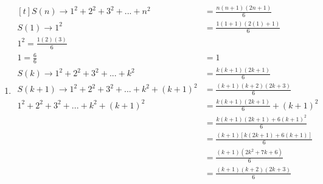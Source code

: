\begin{enumerate}[leftmargin=2cm,labelsep=.5cm,label=\bf\arabic*.]
\begin{enumerate}
\item $
\begin{aligned}[t]
S(n) \rightarrow 1^2+2^2+3^2+...+n^2 &= \frac{n(n+1)(2n+1)}{6}\\
S(1) \rightarrow 1^2&=\frac{1(1+1)(2(1)+1)}{6}\\
1^2=\frac{1(2)(3)}{6}\\
1=\frac{6}{6}&=1\\[2mm]
S(k) \rightarrow 1^2+2^2+3^2+...+k^2 &= \frac{k(k+1)(2k+1)}{6}\\
S(k+1) \rightarrow 1^2+2^2+3^2+...+k^2 +(k+1)^2 &= \frac{(k+1)(k+2)(2k+3)}{6}\\[2mm]
1^2+2^2+3^2+...+k^2 +(k+1)^2 &= \frac{k(k+1)(2k+1)}{6} + (k+1)^2\\
&=\frac{k(k+1)(2k+1)+6(k+1)^2}{6}\\
&=\frac{(k+1)\left[k(2k+1)+6(k+1)\right]}{6}\\
&=\frac{(k+1)(2k^2+7k+6)}{6}\\
&= \frac{(k+1)(k+2)(2k+3)}{6}
\end{aligned} $
\end{enumerate}

\end{enumerate}
